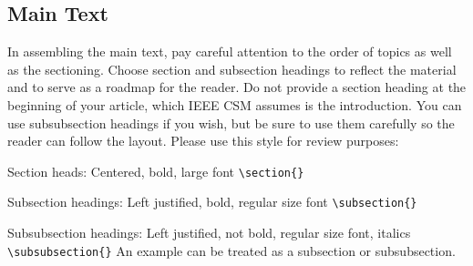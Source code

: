 \subsection{Main Text}

In assembling the main text, pay careful attention to the order of topics as well as the sectioning.  Choose section and subsection headings to reflect the material and to serve as a roadmap for the reader.
Do not provide a section heading at the beginning of your article, which IEEE CSM assumes is the introduction.
You can use subsubsection headings if you wish, but be sure to use them carefully so the reader can follow the layout.
%
Please use this style for review purposes:
\bi
\item[] Section heads:  Centered, bold, large font \verb!\section{}!
\item[] Subsection headings:  Left justified, bold, regular size font \verb!\subsection{}!
\item[] Subsubsection headings:  Left justified, not bold, regular size font, italics \verb!\subsubsection{}!
\ei
An example can be treated as a subsection or subsubsection.
